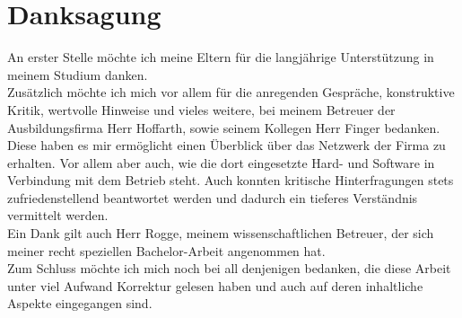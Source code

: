\section*{Danksagung}
\label{sec:Dank}

An erster Stelle möchte ich meine Eltern für die langjährige Unterstützung in meinem Studium danken.\\
Zusätzlich möchte ich mich vor allem für die anregenden Gespräche, konstruktive Kritik, wertvolle Hinweise und vieles weitere, bei meinem Betreuer der Ausbildungsfirma Herr Hoffarth, sowie seinem Kollegen Herr Finger bedanken. Diese haben es mir ermöglicht einen Überblick über das Netzwerk der Firma zu erhalten. Vor allem aber auch, wie die dort eingesetzte Hard- und Software in Verbindung mit dem Betrieb steht. Auch konnten kritische Hinterfragungen stets zufriedenstellend beantwortet werden und dadurch ein tieferes Verständnis vermittelt werden.\\
Ein Dank gilt auch Herr Rogge, meinem wissenschaftlichen Betreuer, der sich meiner recht speziellen Bachelor-Arbeit angenommen hat.\\
Zum Schluss möchte ich mich noch bei all denjenigen bedanken, die diese Arbeit unter viel Aufwand Korrektur gelesen haben und auch auf deren inhaltliche Aspekte eingegangen sind.\\

